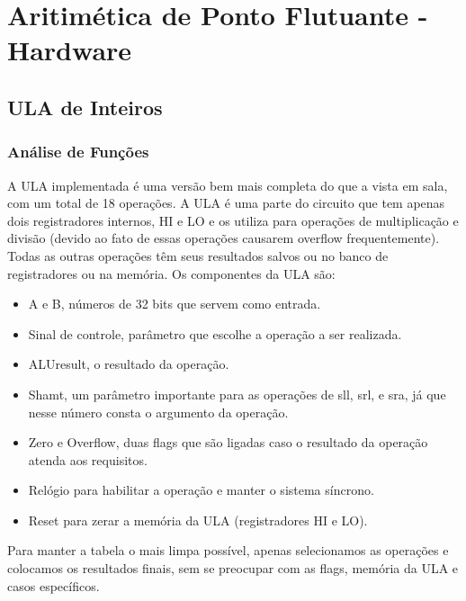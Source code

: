 \section{Aritimética de Ponto Flutuante - Hardware}

\subsection{ULA de Inteiros}
	\subsubsection{Análise de Funções}
A ULA implementada é uma versão bem mais completa do que a vista em sala, com um total de 18 operações. A ULA é uma parte do circuito que tem apenas dois registradores internos, HI e LO e os utiliza para operações de multiplicação e divisão (devido ao fato de essas operações causarem overflow frequentemente). Todas as outras operações têm seus resultados salvos ou no banco de registradores ou na memória. 
Os componentes da ULA são:
\begin{itemize}
\item A e B, números de 32 bits que servem como entrada.
\item Sinal de controle, parâmetro que escolhe a operação a ser realizada.
\item ALUresult, o resultado da operação.
\item Shamt, um parâmetro importante para as operações de sll, srl, e sra, já que nesse número consta o argumento da operação.
\item Zero e Overflow, duas flags que são ligadas caso o resultado da operação atenda aos requisitos.
\item Relógio para habilitar a operação e manter o sistema síncrono.
\item Reset para zerar a memória da ULA (registradores HI e LO).
\end{itemize}
Para manter a tabela o mais limpa possível, apenas selecionamos as operações e colocamos os resultados finais, sem se preocupar com as flags, memória da ULA e casos específicos.

